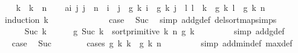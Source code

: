\begin{isabellebody}
\ \ \isamarkupfalse%
\ k\ \ {\isachardoublequoteopen}k\ {\isacharequal}{\kern0pt}\ n{\isachardoublequoteclose}\isanewline
\ \ \isamarkupfalse%
\ a{\isacharcolon}{\kern0pt}{\isachardoublequoteopen}{\isacharparenleft}{\kern0pt}{\isasymforall}i\ j{\isachardot}{\kern0pt}\ j\ {\isacharless}{\kern0pt}\ n\ {\isasymlongrightarrow}\ i\ {\isacharless}{\kern0pt}\ j\ {\isasymlongrightarrow}\ g\ k\ i\ {\isasymle}\ g\ k\ j{\isacharparenright}{\kern0pt}\ {\isasymand}\ {\isacharparenleft}{\kern0pt}{\isasymforall}l{\isachardot}{\kern0pt}\ l\ {\isacharless}{\kern0pt}\ k\ {\isasymlongrightarrow}\ g\ k\ l\ {\isasymle}\ g\ k\ n{\isacharparenright}{\kern0pt}{\isachardoublequoteclose}\isanewline
\ \ \isamarkupfalse%
\ {\isacharparenleft}{\kern0pt}induction\ k{\isacharparenright}{\kern0pt}\isanewline
\ \ \ \ \isamarkupfalse%
\ {}\isanewline
\ \ \ \ \isamarkupfalse%
\ \isamarkupfalse%
\ {\isacharquery}{\kern0pt}case\ \isamarkupfalse%
\ Suc\ \isamarkupfalse%
\ {\isacharparenleft}{\kern0pt}simp\ add{\isacharcolon}{\kern0pt}g{\isacharunderscore}{\kern0pt}def\ del{\isacharcolon}{\kern0pt}sort{\isacharunderscore}{\kern0pt}map{\isachardot}{\kern0pt}simps{\isacharparenright}{\kern0pt}\isanewline
\ \ \isamarkupfalse%
\isanewline
\ \ \ \ \isamarkupfalse%
\ {\isacharparenleft}{\kern0pt}Suc\ k{\isacharparenright}{\kern0pt}\isanewline
\ \ \ \ \isamarkupfalse%
\ {\isachardoublequoteopen}g\ {\isacharparenleft}{\kern0pt}Suc\ k{\isacharparenright}{\kern0pt}\ {\isacharequal}{\kern0pt}\ sort{\isacharunderscore}{\kern0pt}primitive\ k\ n\ {\isacharparenleft}{\kern0pt}g\ k{\isacharparenright}{\kern0pt}{\isachardoublequoteclose}\ \isanewline
\ \ \ \ \ \ \isamarkupfalse%
\ {\isacharparenleft}{\kern0pt}simp\ add{\isacharcolon}{\kern0pt}g{\isacharunderscore}{\kern0pt}def{\isacharparenright}{\kern0pt}\isanewline
\ \ \ \ \isamarkupfalse%
\ \isamarkupfalse%
\ {\isacharquery}{\kern0pt}case\ \isamarkupfalse%
\ Suc\isanewline
\ \ \ \ \ \ \isamarkupfalse%
\ {\isacharparenleft}{\kern0pt}cases\ {\isachardoublequoteopen}g\ k\ k\ {\isasymle}\ g\ k\ n{\isachardoublequoteclose}{\isacharparenright}{\kern0pt}\isanewline
\ \ \ \ \ \ \ \isamarkupfalse%
\ {\isacharparenleft}{\kern0pt}simp\ add{\isacharcolon}{\kern0pt}min{\isacharunderscore}{\kern0pt}def\ max{\isacharunderscore}{\kern0pt}def{\isacharparenright}{\kern0pt}\isanewline

\end{isabellebody}
